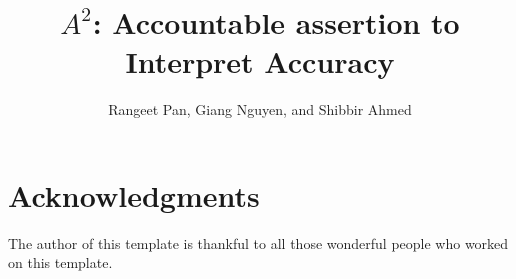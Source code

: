 \documentclass{llncs}
\begin{document}
\title{$A^2$: Accountable assertion to Interpret Accuracy}
\author{Rangeet Pan, Giang Nguyen, and Shibbir Ahmed}

%



\maketitle

\begin{abstract}

\end{abstract}

 




 
%
%
%
\section{Acknowledgments}

The author of this template is thankful to all those 
wonderful people who worked on this template. 


  
\end{document}
